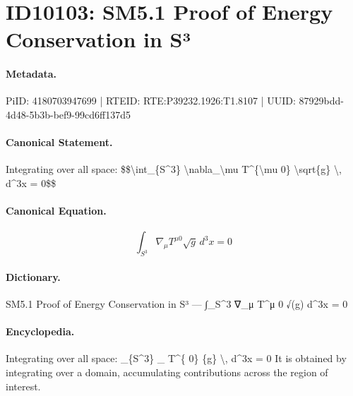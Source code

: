\section*{ID10103: SM5.1 Proof of Energy Conservation in S³}
\paragraph{Metadata.}
PiID: 4180703947699 | RTEID: RTE:P39232.1926:T1.8107 | UUID: 87929bdd-4d48-5b3b-bef9-99cd6ff137d5

\paragraph{Canonical Statement.}
Integrating over all space: \$\$\textbackslash{}int\_\{S\textasciicircum{}3\} \textbackslash{}nabla\_\textbackslash{}mu T\textasciicircum{}\{\textbackslash{}mu 0\} \textbackslash{}sqrt\{g\} \textbackslash{}, d\textasciicircum{}3x = 0\$\$

\paragraph{Canonical Equation.}
\[
\int_{S^3} \nabla_\mu T^{\mu 0} \sqrt{g} \, d^3x = 0
\]

\paragraph{Dictionary.}
SM5.1 Proof of Energy Conservation in S³ — ∫\_S\textasciicircum{}3 ∇\_μ T\textasciicircum{}μ 0 √(g) d\textasciicircum{}3x = 0

\paragraph{Encyclopedia.}
Integrating over all space: \_\{S\textasciicircum{}3\} \_ T\textasciicircum{}\{ 0\} \{g\} \textbackslash{}, d\textasciicircum{}3x = 0 It is obtained by integrating over a domain, accumulating contributions across the region of interest.
